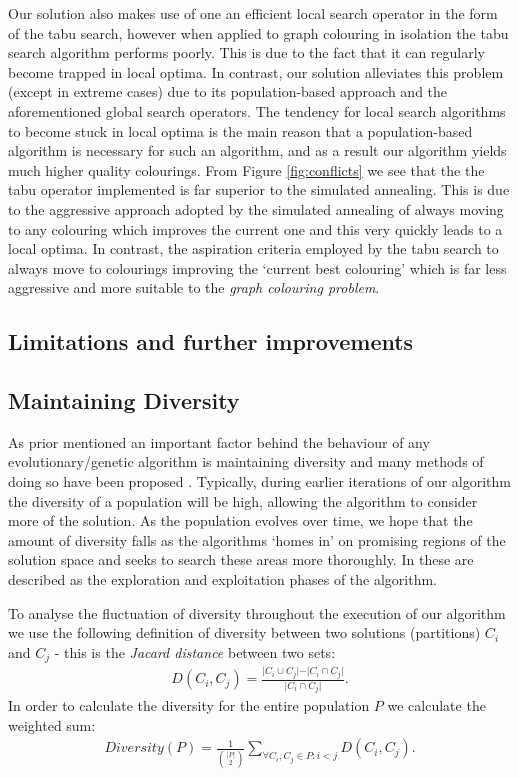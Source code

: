 \documentclass[12pt,a4paper]{article}
\begin{document}
\par Our solution also makes use of one an efficient local search operator in the form of the tabu search, however when applied to graph colouring in isolation the tabu search algorithm performs poorly. This is due to the fact that it can regularly become trapped in local optima. In contrast, our solution alleviates this problem (except in extreme cases) due to its population-based approach and the aforementioned global search operators. The tendency for local search algorithms to become stuck in local optima is the main reason that a population-based algorithm is necessary for such an algorithm, and as a result our algorithm yields much higher quality colourings. From Figure \ref{fig:conflicts} we see that the the tabu operator implemented is far superior to the simulated annealing. This is due to the aggressive approach adopted by the simulated annealing of always moving to any colouring which improves the current one and this very quickly leads to a local optima. In contrast, the aspiration criteria employed by the tabu search to always move to colourings improving the `current best colouring' which is far less aggressive and more suitable to the \textit{graph colouring problem}.

\subsection*{Limitations and further improvements}
\subsection*{Maintaining Diversity}
\par As prior mentioned an important factor behind the behaviour of any evolutionary/genetic algorithm is maintaining diversity and many methods of doing so have been proposed \cite{Gupta}. Typically, during earlier iterations of our algorithm the diversity of a population will be high, allowing the algorithm to consider more of the solution. As the population evolves over time, we hope that the amount of diversity falls as the algorithms `homes in' on promising regions of the solution space and seeks to search these areas more thoroughly. In \cite{Lewis} these are described as the exploration and exploitation phases of the algorithm.
\par To analyse the fluctuation of diversity throughout the execution of our algorithm we use the following definition of diversity between two solutions (partitions) $C_i$ and $C_j$ - this is the \textit{Jacard distance} between two sets:
 \begin{eqnarray*}
 D(C_i, C_j) = \frac{\vert C_i \cup C_j \vert - \vert C_i \cap C_j \vert}{\vert C_i \cap C_j \vert}.
 \end{eqnarray*}
 In order to calculate the diversity for the entire population $P$ we calculate the weighted sum:
 \begin{eqnarray*}
  \textit{Diversity}(P)= \frac{1}{{\vert P \vert \choose 2}}\sum_{\forall C_i, C_j \in P : i < j} D(C_i, C_j).
 \end{eqnarray*}
 
\end{document}
